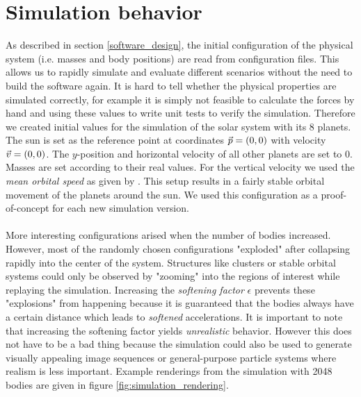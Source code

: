 \documentclass[a4paper,11pt]{scrartcl} %
\newcommand*{\vv}[1]{\vec{\mkern0mu#1}}
\begin{document}
\section{Simulation behavior}
As described in section \ref{software_design}, the initial configuration of the physical system (i.e. masses and body positions) are read from configuration files. This allows us to rapidly simulate and evaluate different scenarios without the need to build the software again. It is hard to tell whether the physical properties are simulated correctly, for example it is simply not feasible to calculate the forces by hand and using these values to write unit tests to verify the simulation. Therefore we created initial values for the simulation of the solar system with its 8 planets. The sun is set as the reference point at coordinates $\vv{p}=(0,0)$ with velocity $\vv{v}=(0,0)$. The $y$-position and horizontal velocity of all other planets are set to 0. Masses are set according to their real values. For the vertical velocity we used the \textit{mean orbital speed} as given by \cite{wikiplanets}. This setup results in a fairly stable orbital movement of the planets around the sun. We used this configuration as a proof-of-concept for each new simulation version.\\\\
More interesting configurations arised when the number of bodies increased. However, most of the randomly chosen configurations "exploded" after collapsing rapidly into the center of the system. Structures like clusters or stable orbital systems could only be observed by "zooming" into the regions of interest while replaying the simulation. Increasing the \textit{softening factor} $\epsilon$ prevents these "explosions" from happening because it is guaranteed that the bodies always have a certain distance which leads to \textit{softened} accelerations. It is important to note that increasing the softening factor yields \textit{unrealistic} behavior. However this does not have to be a bad thing because the simulation could also be used to generate visually appealing image sequences or general-purpose particle systems where realism is less important. Example renderings from the simulation with 2048 bodies are given in figure \ref{fig:simulation_rendering}.
\end{document}
